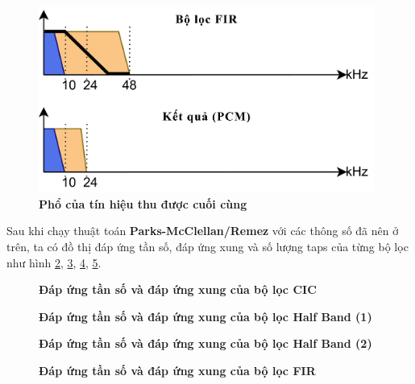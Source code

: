 \begin{figure}[H]
    \centering
    \includegraphics[width=11cm]{Images/Chuong3/4.png}
    \caption[Phổ của tín hiệu thu được cuối cùng]{\bfseries \fontsize{12pt}{0pt}\selectfont Phổ của tín hiệu thu được cuối cùng}
    \label{t4}
\end{figure}

Sau khi chạy thuật toán \textbf{Parks-McClellan/Remez} với các thông số đã nên ở trên, ta có đồ thị đáp ứng tần số, đáp ứng xung và số lượng taps của từng bộ lọc như hình \ref{a}, \ref{b}, \ref{c}, \ref{d}.  
\vspace{1.5cm}
\begin{figure}[H]
    \centering
    
    \caption[Đáp ứng tần số và đáp ứng xung của bộ lọc CIC]{\bfseries \fontsize{12pt}{0pt}\selectfont Đáp ứng tần số và đáp ứng xung của bộ lọc CIC}
    \label{a}
\end{figure}
\vspace{1.5cm}
\begin{figure}[H]
    \centering
    
    \caption[Đáp ứng tần số và đáp ứng xung của bộ lọc Half Band (1)]{\bfseries \fontsize{12pt}{0pt}\selectfont Đáp ứng tần số và đáp ứng xung của bộ lọc Half Band (1)}
    \label{b}
\end{figure}
\vspace{1.5cm}
\begin{figure}[H]
    \centering
    
    \caption[Đáp ứng tần số và đáp ứng xung của bộ lọc Half Band (2)]{\bfseries \fontsize{12pt}{0pt}\selectfont Đáp ứng tần số và đáp ứng xung của bộ lọc Half Band (2)}
    \label{c}
\end{figure}
\begin{figure}[H]
    \centering
    
    \caption[Đáp ứng tần số và đáp ứng xung của bộ lọc FIR]{\bfseries \fontsize{12pt}{0pt}\selectfont Đáp ứng tần số và đáp ứng xung của bộ lọc FIR}
    \label{d}
\end{figure}
